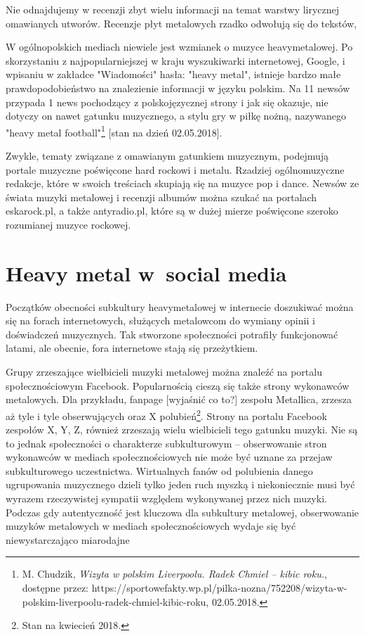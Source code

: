 \documentclass[12pt, a4paper, titlepage]{report}
\begin{document}
Nie odnajdujemy w recenzji zbyt wielu informacji na temat warstwy lirycznej omawianych utworów. Recenzje płyt metalowych rzadko odwołują się do tekstów, 


W ogólnopolskich mediach niewiele jest wzmianek o muzyce heavymetalowej. Po skorzystaniu z najpopularniejszej w kraju wyszukiwarki internetowej, Google, i wpisaniu w zakładce "Wiadomości" hasła: "heavy metal", istnieje bardzo małe prawdopodobieństwo na znalezienie informacji w języku polskim. Na 11 newsów przypada 1 news pochodzący z polskojęzycznej strony i jak się okazuje, nie dotyczy on nawet gatunku muzycznego, a stylu gry w piłkę nożną, nazywanego "heavy metal football"\footnote{M. Chudzik, \textit{Wizyta w polskim Liverpoolu. Radek Chmiel -- kibic roku.}, dostępne przez: https://sportowefakty.wp.pl/pilka-nozna/752208/wizyta-w-polskim-liverpoolu-radek-chmiel-kibic-roku, 02.05.2018.} [stan na dzień 02.05.2018].

Zwykle, tematy związane z omawianym gatunkiem muzycznym, podejmują portale muzyczne poświęcone hard rockowi i metalu. Rzadziej ogólnomuzyczne redakcje, które w swoich treściach skupiają się na muzyce pop i dance. Newsów ze świata muzyki metalowej i recenzji albumów można szukać na portalach eskarock.pl, a także antyradio.pl, które są w dużej mierze poświęcone szeroko rozumianej muzyce rockowej. 

\section{Heavy metal w~social media}
Początków obecności subkultury heavymetalowej w internecie doszukiwać można się na forach internetowych, służących metalowcom do wymiany opinii i doświadczeń muzycznych. Tak stworzone społeczności potrafiły funkcjonować latami, ale obecnie, fora internetowe stają się przeżytkiem. 

Grupy zrzeszające wielbicieli muzyki metalowej można znaleźć na portalu społecznościowym Facebook. Popularnością cieszą się także strony wykonawców metalowych. Dla przykładu, fanpage [wyjaśnić co to?] zespołu Metallica, zrzesza aż tyle i tyle obserwujących oraz X polubień\footnote{Stan na kwiecień 2018.}. Strony na portalu Facebook zespołów X, Y, Z, również zrzeszają wielu wielbicieli tego gatunku muzyki. Nie są to jednak społeczności o charakterze subkulturowym -- obserwowanie stron wykonawców w mediach społecznościowych nie może być uznane za przejaw subkulturowego uczestnictwa. Wirtualnych fanów od polubienia danego ugrupowania muzycznego dzieli tylko jeden ruch myszką i niekoniecznie musi być wyrazem rzeczywistej sympatii względem wykonywanej przez nich muzyki. Podczas gdy autentyczność jest kluczowa dla subkultury metalowej, obserwowanie muzyków metalowych w mediach społecznościowych wydaje się być niewystarczająco miarodajne %
\end{document}
